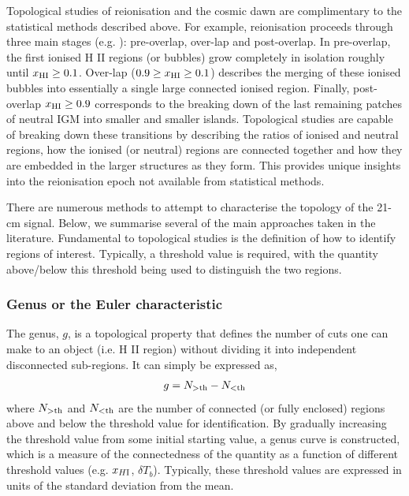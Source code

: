 Topological studies of reionisation and the cosmic dawn are complimentary to the statistical methods described above. For example, reionisation proceeds through three main stages (e.g. \cite{Gnedin:2000,Furlanetto:2016}): pre-overlap, over-lap and post-overlap. In pre-overlap, the first ionised H {\scriptsize II} regions (or bubbles) grow completely in isolation roughly until $x_{\rm HI} \geq 0.1$. Over-lap ($ 0.9 \geq x_{\rm HI} \geq 0.1$) describes the merging of these ionised bubbles into essentially a single large connected ionised region. Finally, post-overlap $x_{\rm HI} \geq 0.9$ corresponds to the breaking down of the last remaining patches of neutral IGM into smaller and smaller islands. Topological studies are capable of breaking down these transitions by describing the ratios of ionised and neutral regions, how the ionised (or neutral) regions are connected together and how they are embedded in the larger structures as they form. This provides unique insights into the reionisation epoch not available from statistical methods.

There are numerous methods to attempt to characterise the topology of the 21-cm signal. Below, we summarise several of the main approaches taken in the literature. Fundamental to topological studies is the definition of how to identify regions of interest. Typically, a threshold value is required, with the quantity above/below this threshold being used to distinguish the two regions.

\subsubsection{Genus or the Euler characteristic}

The genus, $g$, is a topological property that defines the number of cuts one can make to an object (i.e. H {\scriptsize II} region) without dividing it into independent disconnected sub-regions. It can simply be expressed as,
\begin{eqnarray}
g = N_{\rm >th} - N_{\rm < th}
\end{eqnarray}
where $N_{\rm >th}$ and $N_{\rm < th}$ are the number of connected (or fully enclosed) regions above and below the threshold value for identification. By gradually increasing the threshold value from some initial starting value, a genus curve is constructed, which is a measure of the connectedness of the quantity as a function of different threshold values (e.g. $x_{H {\rm \scriptsize I}}$, $\delta T_{b}$). Typically, these threshold values are expressed in units of the standard deviation from the mean.

